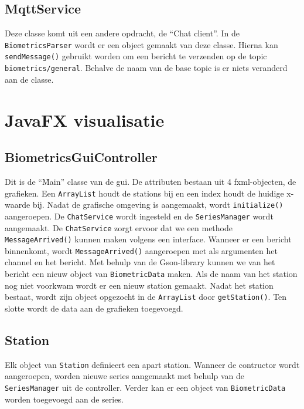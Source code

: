 \documentclass[a4paper]{report}
\newcommand{\code}[1]{\colorbox{light-gray}{\texttt{#1}}}
\begin{document}
        \subsection{MqttService}
        \label{sec:mqttservice}
            Deze classe komt uit een andere opdracht, de ``Chat client''.
            In de \linebreak\code{BiometricsParser} wordt er een object gemaakt van deze classe.
            Hierna kan \code{sendMessage()} gebruikt worden om een bericht te verzenden op de topic \code{biometrics/general}.
            Behalve de naam van de base topic is er niets veranderd aan de classe.

    \section{JavaFX visualisatie}
        \subsection{BiometricsGuiController}
            Dit is de ``M̀ain'' classe van de gui.
            De attributen bestaan uit 4 fxml-objecten, de grafieken.
            Een \code{ArrayList} houdt de stations bij en een index houdt de huidige x-waarde bij.
            Nadat de grafische omgeving is aangemaakt, wordt \code{initialize()} aangeroepen.
            De \code{ChatService} wordt ingesteld en de \code{SeriesManager} wordt aangemaakt.
            De \code{ChatService} zorgt ervoor dat we een methode \code{MessageArrived()} kunnen maken volgens een interface.
            Wanneer er een bericht binnenkomt, wordt \code{MessageArrived()} aangeroepen met als argumenten het channel en het bericht.
            Met behulp van de Gson-library kunnen we van het bericht een nieuw object van \code{BiometricData} maken.
            Als de naam van het station nog niet voorkwam wordt er een nieuw station gemaakt.
            Nadat het station bestaat, wordt zijn object opgezocht in de \code{ArrayList} door \code{getStation()}.
            Ten slotte wordt de data aan de grafieken toegevoegd.
            
        \subsection{Station}
            Elk object van \code{Station} definieert een apart station.
            Wanneer de contructor wordt aangeroepen, worden nieuwe series aangemaakt met behulp van de \code{SeriesManager} uit de controller.
            Verder kan er een object van \code{BiometricData} worden toegevoegd aan de series.
\end{document}
